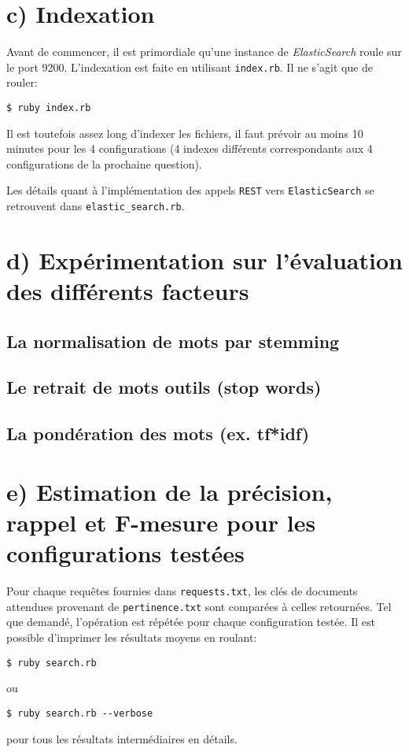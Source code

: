 \documentclass[12pt]{article}
\begin{document}
\section{c) Indexation}
Avant de commencer, il est primordiale qu'une instance de \textit{ElasticSearch} roule sur le port 9200. L'indexation est faite en utilisant \verb;index.rb;. Il ne s'agit que de rouler:

\begin{verbatim}
$ ruby index.rb
\end{verbatim}

Il est toutefois assez long d'indexer les fichiers, il faut prévoir au moins 10 minutes pour les 4 configurations (4 indexes différents correspondants aux 4 configurations de la prochaine question).

Les détails quant à l'implémentation des appels \verb;REST; vers \verb;ElasticSearch; se retrouvent dans \verb;elastic_search.rb;.

\section{d) Expérimentation sur l'évaluation des différents facteurs}
\subsection{La normalisation de mots par stemming}
\subsection{Le retrait de mots outils (stop words)}
\subsection{La pondération des mots (ex. tf*idf)}

\section{e) Estimation de la précision, rappel et F-mesure pour les configurations testées}

Pour chaque requêtes fournies dans \verb;requests.txt;, les clés de documents attendues provenant de \verb;pertinence.txt; sont comparées à celles retournées. Tel que demandé, l'opération est répétée pour chaque configuration testée. Il est possible d'imprimer les résultats moyens en roulant:

\begin{verbatim}
$ ruby search.rb
\end{verbatim}

ou

\begin{verbatim}
$ ruby search.rb --verbose
\end{verbatim}

pour tous les résultats intermédiaires en détails.

\end{document}
